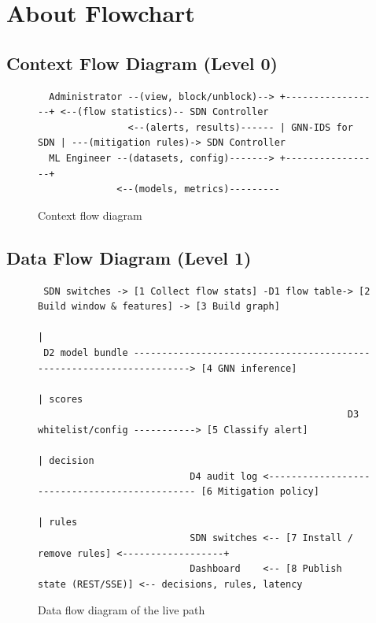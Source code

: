 \section{About Flowchart}

\subsection{Context Flow Diagram (Level 0)}

\begin{figure}[htbp]
\centering
\scriptsize
\begin{verbatim}
  Administrator --(view, block/unblock)--> +-----------------+ <--(flow statistics)-- SDN Controller
                <--(alerts, results)------ | GNN-IDS for SDN | ---(mitigation rules)-> SDN Controller
  ML Engineer --(datasets, config)-------> +-----------------+
              <--(models, metrics)---------
\end{verbatim}
\caption{Context flow diagram}
\label{fig:cfd}
\end{figure}

\subsection{Data Flow Diagram (Level 1)}

\begin{figure}[htbp]
\centering
\scriptsize
\begin{verbatim}
 SDN switches -> [1 Collect flow stats] -D1 flow table-> [2 Build window & features] -> [3 Build graph]
                                                                                           |
 D2 model bundle ---------------------------------------------------------------------> [4 GNN inference]
                                                                                           | scores
                                                       D3 whitelist/config -----------> [5 Classify alert]
                                                                                           | decision
                           D4 audit log <---------------------------------------------- [6 Mitigation policy]
                                                                                           | rules
                           SDN switches <-- [7 Install / remove rules] <------------------+
                           Dashboard    <-- [8 Publish state (REST/SSE)] <-- decisions, rules, latency
\end{verbatim}
\caption{Data flow diagram of the live path}
\label{fig:dfd}
\end{figure}

